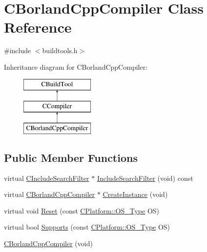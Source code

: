 \hypertarget{classCBorlandCppCompiler}{\section{C\-Borland\-Cpp\-Compiler Class Reference}
\label{classCBorlandCppCompiler}
}


{\ttfamily \#include $<$buildtools.\-h$>$}

Inheritance diagram for C\-Borland\-Cpp\-Compiler\-:\begin{figure}[H]
\begin{center}
\leavevmode
\includegraphics[height=3.000000cm]{da/dd2/classCBorlandCppCompiler}
\end{center}
\end{figure}
\subsection*{Public Member Functions}
\begin{DoxyCompactItemize}
\item 
virtual \hyperlink{classCIncludeSearchFilter}{C\-Include\-Search\-Filter} $\ast$ \hyperlink{classCBorlandCppCompiler_a9619772f500bb2f06d4a07349b08d05d}{Include\-Search\-Filter} (void) const 
\item 
virtual \hyperlink{classCBorlandCppCompiler}{C\-Borland\-Cpp\-Compiler} $\ast$ \hyperlink{classCBorlandCppCompiler_a49178aa21245a1400f38c71631b7fa78}{Create\-Instance} (void)
\item 
virtual void \hyperlink{classCBorlandCppCompiler_ac329f9e685bd1a702d7545fa991be71d}{Reset} (const \hyperlink{classCPlatform_a2fb735c63c53052f79629e338bb0f535}{C\-Platform\-::\-O\-S\-\_\-\-Type} O\-S)
\item 
virtual bool \hyperlink{classCBorlandCppCompiler_a68255b1124b821456884050014e1b256}{Supports} (const \hyperlink{classCPlatform_a2fb735c63c53052f79629e338bb0f535}{C\-Platform\-::\-O\-S\-\_\-\-Type} O\-S)
\item 
\hyperlink{classCBorlandCppCompiler_aaa978e5b4d1f2f941b57838c4082d8f2}{C\-Borland\-Cpp\-Compiler} (void)
\end{DoxyCompactItemize}
